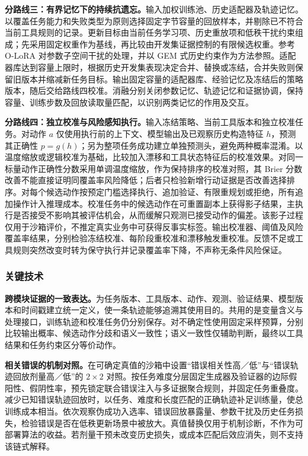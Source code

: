 \textbf{分路线三：有界记忆下的持续抗遗忘。}输入加权训练池、历史适配器及轨迹记忆。以覆盖任务能力和失败类型为原则选择固定字节容量的回放样本，并剔除已不符合当前工具规则的记录。更新目标由当前任务学习项、历史重放项和低秩干扰约束组成；先采用固定权重作为基线，再比较由开发集证据控制的有限候选权重。参考 O-LoRA 对参数子空间干扰的处理，并以 GEM 式历史约束作为方法参照\cite{olora,gem}。适配器库达到容量上限时，根据历史开发集表现决定合并、替换或冻结，合并失败则保留旧版本并缩减新任务目标。输出固定容量的适配器库、经验记忆及冻结后的策略版本，随后交给路线四校准。消融分别关闭参数记忆、轨迹记忆和证据协调，保持容量、训练步数及回放读取量匹配，以识别两类记忆的作用及交互。

\textbf{分路线四：独立校准与风险感知执行。}输入冻结策略、当前工具版本和独立校准任务。对动作 $a$ 仅使用执行前的上下文、模型输出及已观察历史构造特征 $h$，预测其正确性 $p=g(h)$；另为整项任务成功建立单独预测头，避免两种概率混淆。以温度缩放或逻辑校准为基础，比较加入漂移和工具状态特征后的校准效果\cite{calibration}。对同一标量动作正确性分数采用单调温度缩放，作为保持排序的校准对照，其 Brier 分数改善不能直接证明同覆盖率风险降低；后者只检验新增行动证据是否改善选择排序。对每个候选动作按预定门槛选择执行、追加验证、有限重规划或拒绝，所有追加操作计入推理成本。校准任务中的候选动作在可重置副本上获得影子结果，主执行是否接受不影响其被评估机会，从而缓解只观测已接受动作的偏差。该影子过程仅用于沙箱评价，不推定真实业务中可获得反事实标签。输出校准器、阈值及风险覆盖率结果，分别检验冻结校准、每阶段重校准和漂移触发重校准。反馈不足或工具规则突然改变时转为保守执行并记录覆盖率下降，不声称无条件风险保证\cite{selective,conformalrisk,adaptiveconformal}。

\subsubsection{关键技术}

\textbf{跨模块证据的一致表达。}为任务版本、工具版本、动作、观测、验证结果、模型版本和时间戳建立统一定义，使一条轨迹能够追溯其使用目的。共用的是变量含义与处理接口，训练轨迹和校准任务仍分别保存。对不确定性使用固定采样预算，分别比较输出概率、候选动作分歧和语义一致性；语义一致性仅辅助判断，最终以工具结果和任务约束区分等价动作\cite{semantic}。

\textbf{相关错误的机制对照。}在可确定真值的沙箱中设置“错误相关性高／低”与“错误轨迹回放剂量高／低”的 $2\times2$ 对照。按任务难度分层固定生成器及验证器的边际假阳性、假阴性率，预先锁定联合错误注入与多证据聚合规则，并固定任务重叠度。减少已知错误轨迹回放时，以任务、难度和长度匹配的正确轨迹补足训练量，使总训练成本相当。依次观察伪成功入选率、错误回放暴露量、参数干扰及历史任务损失，检验错误是否在低秩更新场景中被放大。真值替换仅用于机制诊断，不作为可部署算法的收益。若剂量干预未改变历史损失，或成本匹配后效应消失，则不支持该链式解释。

